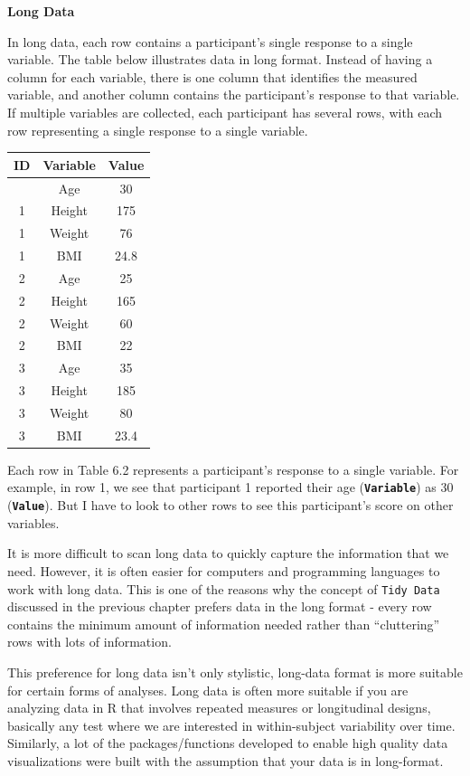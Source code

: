 \documentclass[
]{book}
\begin{document}
\textbf{Long Data}

In long data, each row contains a participant's single response to a single variable. The table below illustrates data in long format. Instead of having a column for each variable, there is one column that identifies the measured variable, and another column contains the participant's response to that variable. If multiple variables are collected, each participant has several rows, with each row representing a single response to a single variable.

\begin{longtable}[]{@{}ccc@{}}
\toprule\noalign{}
ID & Variable & Value \\
\midrule\noalign{}
\endhead
\bottomrule\noalign{}
\endlastfoot
1 & Age & 30 \\
1 & Height & 175 \\
1 & Weight & 76 \\
1 & BMI & 24.8 \\
2 & Age & 25 \\
2 & Height & 165 \\
2 & Weight & 60 \\
2 & BMI & 22 \\
3 & Age & 35 \\
3 & Height & 185 \\
3 & Weight & 80 \\
3 & BMI & 23.4 \\
\end{longtable}

Each row in Table 6.2 represents a participant's response to a single variable. For example, in row 1, we see that participant 1 reported their age (\textbf{\texttt{Variable}}) as 30 (\textbf{\texttt{Value}}). But I have to look to other rows to see this participant's score on other variables.

It is more difficult to scan long data to quickly capture the information that we need. However, it is often easier for computers and programming languages to work with long data. This is one of the reasons why the concept of \texttt{Tidy\ Data} discussed in the previous chapter prefers data in the long format - every row contains the minimum amount of information needed rather than ``cluttering'' rows with lots of information.

This preference for long data isn't only stylistic, long-data format is more suitable for certain forms of analyses. Long data is often more suitable if you are analyzing data in R that involves repeated measures or longitudinal designs, basically any test where we are interested in within-subject variability over time. Similarly, a lot of the packages/functions developed to enable high quality data visualizations were built with the assumption that your data is in long-format.
\end{document}
